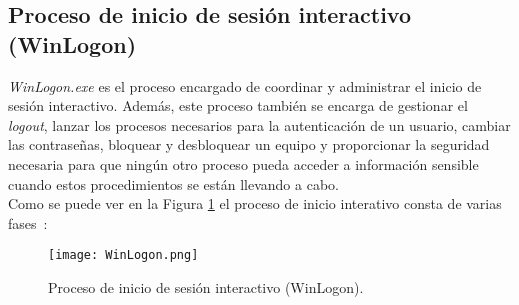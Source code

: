 \subsection{Proceso de inicio de sesión interactivo (WinLogon)}

{\it WinLogon.exe} es el proceso encargado de coordinar y administrar el inicio de sesión interactivo. Además, este proceso también se encarga de gestionar el {\it logout}, lanzar los procesos necesarios para la autenticación de un usuario, cambiar las contraseñas, bloquear y desbloquear un equipo y proporcionar la seguridad necesaria para que ningún otro proceso pueda acceder a información sensible cuando estos procedimientos se están llevando a cabo. \\

Como se puede ver en la Figura \ref{WinLogon} el proceso de inicio interativo consta de varias fases~\cite{Capitulo2:WinInternals}:

\begin{figure}[t!] %
\begin{center}
\texttt{[image: WinLogon.png]}
\end{center}
\caption{Proceso de inicio de sesión interactivo (WinLogon).}
\label{WinLogon}
\end{figure}

